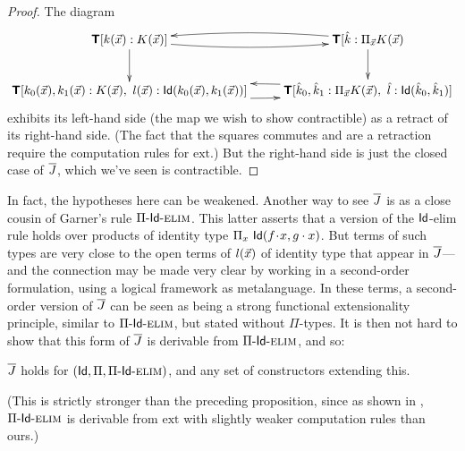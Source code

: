 \documentclass{amsart}
\newcommand{\ext}{\mathrm{ext}}
\begin{document}
\begin{proof}
The diagram
$$\xymatrix{\T[k(\x):K(\x)] \ar[d] \ar@/_/[r] & \ar@/_/[l] \T[\hat{k}:\Pi_{\x} K(\x) \ar[d] \\ 
\T[k_0(\x),k_1(\x):K(\x),\ l(\x):\Id(k_0(\x),k_1(\x))] \ar@/_/[r] & \ar@/_/[l] \T[\hat{k}_0,\hat{k}_1 : \Pi_{\x} K(\x),\ \hat{l}:\Id(\hat{k}_0,\hat{k}_1)]}$$
exhibits its left-hand side (the map we wish to show contractible) as a retract of its right-hand side.  (The fact that the squares commutes and are a retraction require the computation rules for $\ext$.)  But the right-hand side is just the closed case of $\overline{J}$, which we've seen is contractible.

\end{proof}

\begin{para} In fact, the hypotheses here can be weakened.  Another way to see $\overline{J}$ is as a close cousin of Garner's rule ${\Pi\mbox{-}\mathsf{Id}\mbox{-}\textsc{elim}}$.  This latter asserts that a version of the $\mathsf{Id}$-elim rule holds over products of identity type $\Pi_x\ \mathsf{Id}(f \! \cdot \! x, g \cdot x)$.  But terms of such types are very close to the open terms of $l(\vec x)$ of identity type that appear in $\overline{J}$---and the connection may be made very clear by working in a second-order formulation, using a logical framework as metalanguage.  In these terms, a second-order version of $\overline{J}$ can be seen as being a strong functional extensionality principle, similar to ${\Pi\mbox{-}\mathsf{Id}\mbox{-}\textsc{elim}}$, but stated without $\Pi$-types.   It is then not hard to show that this form of $\overline{J}$ is derivable from ${\Pi\mbox{-}\mathsf{Id}\mbox{-}\textsc{elim}}$, and so:
\end{para}

\begin{proposition}\label{prop:jbar-holds-2}
$\overline{J}$ holds for $(\mathsf{Id},\Pi,{\Pi\mbox{-}\mathsf{Id}\mbox{-}\textsc{elim}})$, and any set of constructors extending this.
\end{proposition}

(This is strictly stronger than the preceding proposition, since as shown in \cite[5.11]{garner:on-the-strength}, ${\Pi\mbox{-}\mathsf{Id}\mbox{-}\textsc{elim}}$ is derivable from $\ext$ with slightly weaker computation rules than ours.)
\end{document}
